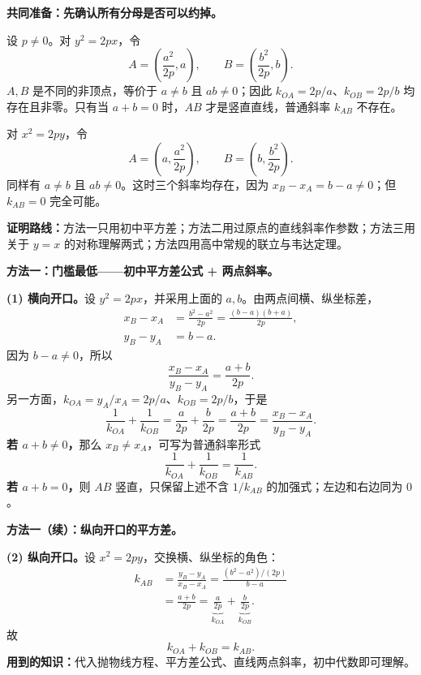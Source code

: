 \clearpage
\begin{proofbox}
\textbf{共同准备：先确认所有分母是否可以约掉。}

设 $p\ne0$。对 $y^2=2px$，令
\[
A=\left(\frac{a^2}{2p},a\right),\qquad
B=\left(\frac{b^2}{2p},b\right).
\]
$A,B$ 是不同的非顶点，等价于 $a\ne b$ 且 $ab\ne0$；因此 $k_{OA}=2p/a$、$k_{OB}=2p/b$ 均存在且非零。只有当 $a+b=0$ 时，$AB$ 才是竖直直线，普通斜率 $k_{AB}$ 不存在。

对 $x^2=2py$，令
\[
A=\left(a,\frac{a^2}{2p}\right),\qquad
B=\left(b,\frac{b^2}{2p}\right).
\]
同样有 $a\ne b$ 且 $ab\ne0$。这时三个斜率均存在，因为 $x_B-x_A=b-a\ne0$；但 $k_{AB}=0$ 完全可能。

\textbf{证明路线：}方法一只用初中平方差；方法二用过原点的直线斜率作参数；方法三用关于 $y=x$ 的对称理解两式；方法四用高中常规的联立与韦达定理。
\end{proofbox}

\clearpage
\begin{proofbox}
\textbf{方法一：门槛最低——初中平方差公式 + 两点斜率。}
\begin{center}\end{center}

\textbf{(1) 横向开口。}设 $y^2=2px$，并采用上面的 $a,b$。由两点间横、纵坐标差，
\[
\begin{aligned}
x_B-x_A
 &=\frac{b^2-a^2}{2p}
 =\frac{(b-a)(b+a)}{2p},\\
y_B-y_A&=b-a.
\end{aligned}
\]
因为 $b-a\ne0$，所以
\[
\frac{x_B-x_A}{y_B-y_A}=\frac{a+b}{2p}.
\]
另一方面，$k_{OA}=y_A/x_A=2p/a$、$k_{OB}=2p/b$，于是
\[
\frac1{k_{OA}}+\frac1{k_{OB}}
 =\frac{a}{2p}+\frac{b}{2p}
 =\frac{a+b}{2p}
 =\frac{x_B-x_A}{y_B-y_A}.
\]
\textbf{若 $a+b\ne0$，}那么 $x_B\ne x_A$，可写为普通斜率形式
\[
\boxed{\frac1{k_{OA}}+\frac1{k_{OB}}=\frac1{k_{AB}}}.
\]
\textbf{若 $a+b=0$，}则 $AB$ 竖直，只保留上述不含 $1/k_{AB}$ 的加强式；左边和右边同为 $0$。

\end{proofbox}
\clearpage
\begin{proofbox}
\textbf{方法一（续）：纵向开口的平方差。}
\begin{center}\end{center}
\textbf{(2) 纵向开口。}设 $x^2=2py$，交换横、纵坐标的角色：
\[
\begin{aligned}
k_{AB}
&=\frac{y_B-y_A}{x_B-x_A}
 =\frac{(b^2-a^2)/(2p)}{b-a}\\
&=\frac{a+b}{2p}
 =\underbrace{\frac a{2p}}_{k_{OA}}
  +\underbrace{\frac b{2p}}_{k_{OB}}.
\end{aligned}
\]
故
\[
\boxed{k_{OA}+k_{OB}=k_{AB}}.
\]
\textbf{用到的知识：}代入抛物线方程、平方差公式、直线两点斜率，初中代数即可理解。
\end{proofbox}

